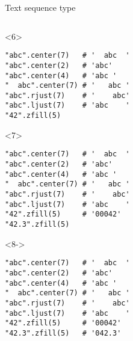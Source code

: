 \begin{frame}[fragile]{Text sequence type}
\begin{columns}[onlytextwidth]
\begin{column}{\textwidth}
      \begin{onlyenv}<6>
        \begin{lstlisting}[style=python]
"abc".center(7)   # '  abc  '
"abc".center(2)   # 'abc'
"abc".center(4)   # 'abc '
"  abc".center(7) # '   abc '
"abc".rjust(7)    # '    abc'
"abc".ljust(7)    # 'abc    '
"42".zfill(5)
 \end{lstlisting}
      \end{onlyenv}

      \begin{onlyenv}<7>
        \begin{lstlisting}[style=python]
"abc".center(7)   # '  abc  '
"abc".center(2)   # 'abc'
"abc".center(4)   # 'abc '
"  abc".center(7) # '   abc '
"abc".rjust(7)    # '    abc'
"abc".ljust(7)    # 'abc    '
"42".zfill(5)     # '00042'
"42.3".zfill(5) \end{lstlisting}
      \end{onlyenv}

      \begin{onlyenv}<8->
        \begin{lstlisting}[style=python]
"abc".center(7)   # '  abc  '
"abc".center(2)   # 'abc'
"abc".center(4)   # 'abc '
"  abc".center(7) # '   abc '
"abc".rjust(7)    # '    abc'
"abc".ljust(7)    # 'abc    '
"42".zfill(5)     # '00042'
"42.3".zfill(5)   # '042.3' \end{lstlisting}
      \end{onlyenv}

    \end{column}
  \end{columns}

\end{frame}
